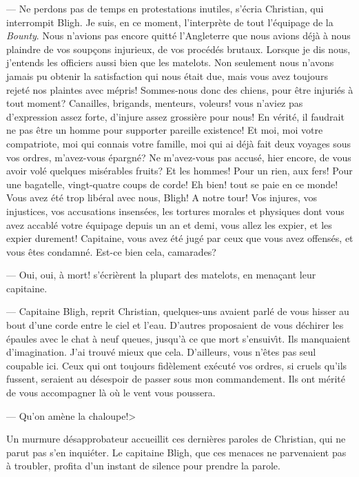 --- Ne perdons pas de temps en protestations inutiles,
s'\'ecria Christian, qui interrompit Bligh. Je suis,
en ce moment, l'interpr\`ete de tout l'\'equipage
de la {\sl Bounty}.
Nous n'avions pas encore quitt\'e l'Angleterre que nous
avions d\'ej\`a \`a nous plaindre de vos soup\c{c}ons
injurieux, de vos proc\'ed\'es brutaux. Lorsque je dis
nous, j'entends les officiers aussi bien que les matelots.
Non seulement nous n'avons jamais pu obtenir la satisfaction
qui nous \'etait due, mais vous avez toujours rejet\'e
nos plaintes avec m\'epris! Sommes-nous donc des chiens,
pour \^etre injuri\'es \`a tout moment?
Canailles, brigands, menteurs, voleurs! vous n'aviez
pas d'expression assez forte, d'injure assez grossi\`ere
pour nous! En v\'erit\'e, il faudrait ne pas \^etre un
homme pour supporter pareille existence!
Et moi, moi votre compatriote, moi qui connais votre
famille, moi qui ai d\'ej\`a fait deux voyages sous
vos ordres, m'avez-vous \'epargn\'e?
Ne m'avez-vous pas accus\'e, hier encore, de vous avoir
vol\'e quelques mis\'erables fruits? Et les hommes!
Pour un rien, aux fers!
Pour une bagatelle, vingt-quatre coups de corde!
Eh bien! tout se paie en ce monde!
Vous avez \'et\'e trop lib\'eral avec nous, Bligh!
A notre tour! Vos injures, vos injustices,
vos accusations insens\'ees, les tortures morales
et physiques dont vous avez accabl\'e votre \'equipage
depuis un an et demi, vous allez les expier,
et les expier durement!
Capitaine, vous avez \'et\'e jug\'e par ceux que vous avez
offens\'es, et vous \^etes condamn\'e.
Est-ce bien cela, camarades?

--- Oui, oui, \`a mort! s'\'ecri\`erent
la plupart des matelots, en mena\c{c}ant leur capitaine.

--- Capitaine Bligh, reprit Christian, quelques-uns
avaient parl\'e de vous hisser au bout d'une corde
entre le ciel et l'eau. D'autres proposaient de vous
d\'echirer les \'epaules avec le chat \`a neuf queues,
jusqu'\`a ce que mort s'ensuiv{\^\i}t. Ils manquaient
d'imagination. J'ai trouv\'e mieux que cela. D'ailleurs,
vous n'\^etes pas seul coupable ici. Ceux qui ont toujours
fid\`element ex\'ecut\'e vos ordres, si cruels qu'ils
fussent, seraient au d\'esespoir de passer sous mon
commandement. Ils ont m\'erit\'e de vous accompagner
l\`a o\`u le vent vous poussera.

--- Qu'on am\`ene la chaloupe!>

Un murmure d\'esapprobateur accueillit ces derni\`eres
paroles de Christian, qui ne parut pas s'en inqui\'eter.
Le capitaine Bligh, que ces menaces ne parvenaient pas
\`a troubler, profita d'un instant de silence pour prendre
la parole.

